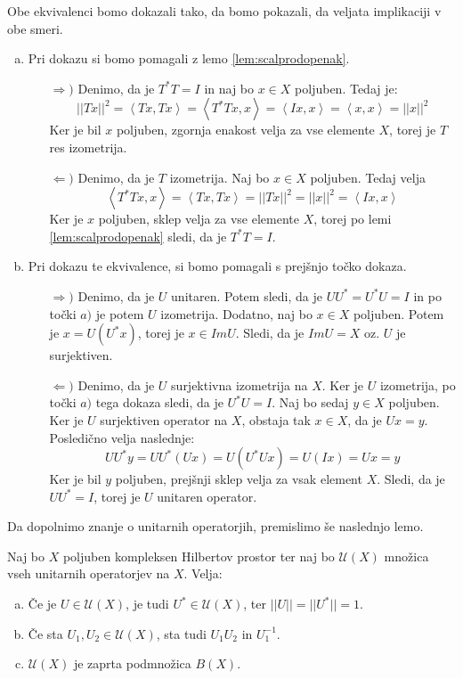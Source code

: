 \documentclass[mat2]{matdelo}
\newcommand{\abs}[1]{\ensuremath{\lvert #1 \rvert}}
\newcommand{\norm}[1]{\abs{\abs{#1}}}
\newcommand{\Sp}[2]{\ensuremath{\left<#1, #2\right>}}
\begin{document}
			\begin{dokaz}
				Obe ekvivalenci bomo dokazali tako, da bomo pokazali, da veljata implikaciji v obe smeri.
				\begin{enumerate}[a)]
					\item Pri dokazu si bomo pomagali z lemo \ref{lem:scalprodopenak}. \begin{itemize}
						\item[$\Rightarrow)$] Denimo, da je $T^*T = I$ in naj bo $x\in X$ poljuben. Tedaj je: $$\norm{Tx}^2=\Sp{Tx}{Tx} = \Sp{T^*Tx}{x}= \Sp{Ix}{x} = \Sp{x}{x} = \norm{x}^2$$
						Ker je bil $x$ poljuben, zgornja enakost velja za vse elemente $X$, torej je $T$ res izometrija.
						\item[$\Leftarrow)$] Denimo, da je $T$ izometrija. Naj bo $x\in X$ poljuben. Tedaj velja $$\Sp{T^*Tx}{x} = \Sp{Tx}{Tx} = \norm{Tx}^2 = \norm{x}^2 = \Sp{Ix}{x}$$
						Ker je $x$ poljuben, sklep velja za vse elemente $X$, torej po lemi \ref{lem:scalprodopenak} sledi, da je $T^*T = I$.
					\end{itemize}
					\item Pri dokazu te ekvivalence, si bomo pomagali s prejšnjo točko dokaza.  \begin{itemize}
						\item[$\Rightarrow)$] Denimo, da je $U$ unitaren. Potem sledi, da je $UU^*=U^*U = I$ in po točki $a)$ je potem $U$ izometrija. Dodatno, naj bo $x\in X$ poljuben. Potem je $x = U(U^*x)$, torej je $x\in ImU$. Sledi, da je $ImU = X$ oz. $U$ je surjektiven.
						\item[$\Leftarrow)$] Denimo, da je $U$ surjektivna izometrija na $X$. Ker je $U$ izometrija, po točki $a)$ tega dokaza sledi, da je $U^*U = I$. Naj bo sedaj $y\in X$ poljuben. Ker je $U$ surjektiven operator na $X$, obstaja tak $x\in X$, da je $Ux = y$. Posledično velja naslednje: $$UU^*y = UU^*(Ux) = U(U^*Ux) = U(Ix) = Ux = y$$
						Ker je bil $y$ poljuben, prejšnji sklep velja za vsak element $X$. Sledi, da je $UU^* = I$, torej je $U$ unitaren operator.
					\end{itemize}
				\end{enumerate}
			\end{dokaz}
			
			Da dopolnimo znanje o unitarnih operatorjih, premislimo še naslednjo lemo.
			
			\begin{lema}
				\label{lem:unitarset}
				Naj bo $X$ poljuben kompleksen Hilbertov prostor ter naj bo $\mathcal{U}(X)$ množica vseh unitarnih operatorjev na $X$. Velja:
				\begin{enumerate}[a)]
					\item Če je $U\in \mathcal{U}(X)$, je tudi $U^*\in \mathcal{U}(X)$, ter $\norm{U} = \norm{U^*} = 1$.
					\item Če sta $U_1, U_2 \in \mathcal{U}(X)$, sta tudi $U_1U_2$ in $U_1^{-1}$.
					\item $\mathcal{U}(X)$ je zaprta podmnožica $B(X)$.
				\end{enumerate}
			\end{lema}
			
\end{document}
